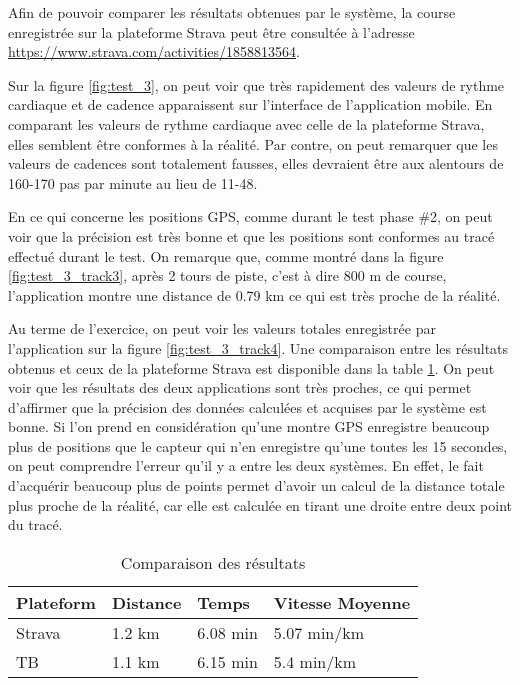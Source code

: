 Afin de pouvoir comparer les résultats obtenues par le système, la course enregistrée sur la plateforme Strava peut être consultée à l'adresse \url{https://www.strava.com/activities/1858813564}.

Sur la figure \ref{fig:test_3}, on peut voir que très rapidement des valeurs de rythme cardiaque et de cadence apparaissent sur l'interface de l'application mobile. En comparant les valeurs de rythme cardiaque avec celle de la plateforme Strava, elles semblent être conformes à la réalité. Par contre, on peut remarquer que les valeurs de cadences sont totalement fausses, elles devraient être aux alentours de 160-170 pas par minute au lieu de 11-48.

En ce qui concerne les positions GPS, comme durant le test phase \#2, on peut voir que la précision est très bonne et que les positions sont conformes au tracé effectué durant le test. On remarque que, comme montré dans la figure \ref{fig:test_3_track3}, après 2 tours de piste, c'est à dire 800 m de course, l'application montre une distance de 0.79 km ce qui est très proche de la réalité.

Au terme de l'exercice, on peut voir les valeurs totales enregistrée par l'application sur la figure \ref{fig:test_3_track4}. Une comparaison entre les résultats obtenus et ceux de la plateforme Strava est disponible dans la table \ref{tab:comp_results}. On peut voir que les résultats des deux applications sont très proches, ce qui permet d’affirmer que la précision des données calculées et acquises par le système est bonne. Si l’on prend en considération qu'une montre GPS enregistre beaucoup plus de positions que le capteur qui n'en enregistre qu'une toutes les 15 secondes, on peut comprendre l'erreur qu'il y a entre les deux systèmes. En effet, le fait d'acquérir beaucoup plus de points permet d'avoir un calcul de la distance totale plus proche de la réalité, car elle est calculée en tirant une droite entre deux point du tracé.

\begin{table}[htb]
\caption{Comparaison des résultats}
\label{tab:comp_results}
\centering
\begin{tabular}{ l l l l }
\toprule
Plateform & Distance & Temps & Vitesse Moyenne  \\
\midrule
Strava & 1.2 km & 6.08 min & 5.07 min/km \\
TB & 1.1 km & 6.15 min & 5.4 min/km \\
\bottomrule 
\end{tabular}
\end{table}

